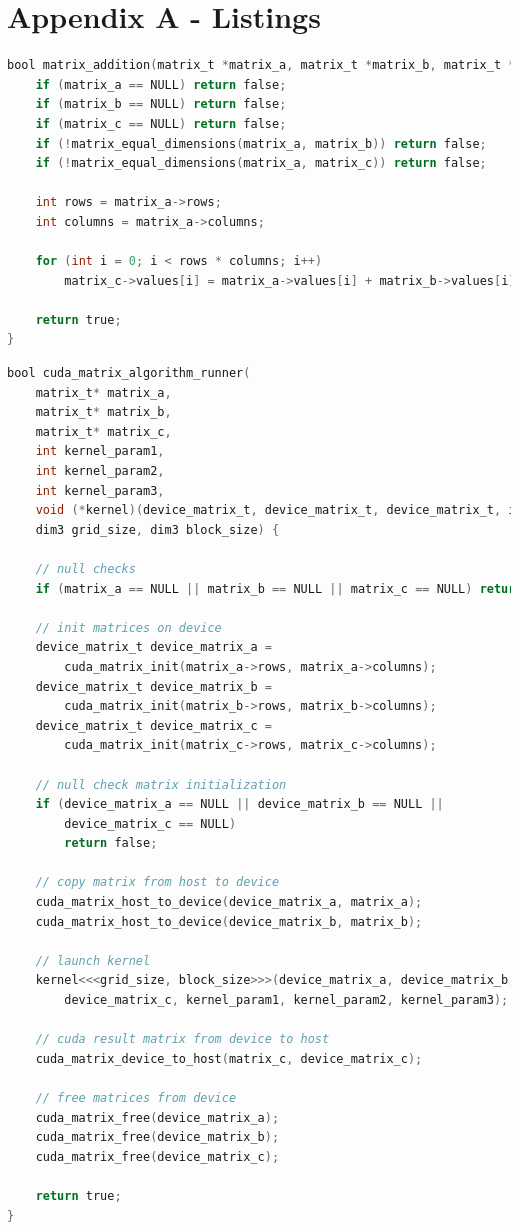 \section*{Appendix A - Listings}

\begin{lstlisting}[language=C, caption={CPU addition algorithm}, label={lst:cpu_addition}]
bool matrix_addition(matrix_t *matrix_a, matrix_t *matrix_b, matrix_t *matrix_c) {
    if (matrix_a == NULL) return false;
    if (matrix_b == NULL) return false;
    if (matrix_c == NULL) return false;
    if (!matrix_equal_dimensions(matrix_a, matrix_b)) return false;
    if (!matrix_equal_dimensions(matrix_a, matrix_c)) return false;

    int rows = matrix_a->rows;
    int columns = matrix_a->columns;

    for (int i = 0; i < rows * columns; i++)
        matrix_c->values[i] = matrix_a->values[i] + matrix_b->values[i];

    return true;
}
\end{lstlisting}

\begin{lstlisting}[language=C, caption={Algorithm runner for GPU algorithms.}, label={lst:algorithm_runner}]
bool cuda_matrix_algorithm_runner(
    matrix_t* matrix_a, 
    matrix_t* matrix_b,
    matrix_t* matrix_c, 
    int kernel_param1, 
    int kernel_param2, 
    int kernel_param3,
    void (*kernel)(device_matrix_t, device_matrix_t, device_matrix_t, int, int, int),
    dim3 grid_size, dim3 block_size) {
    
    // null checks
    if (matrix_a == NULL || matrix_b == NULL || matrix_c == NULL) return false;

    // init matrices on device
    device_matrix_t device_matrix_a =
        cuda_matrix_init(matrix_a->rows, matrix_a->columns);
    device_matrix_t device_matrix_b =
        cuda_matrix_init(matrix_b->rows, matrix_b->columns);
    device_matrix_t device_matrix_c =
        cuda_matrix_init(matrix_c->rows, matrix_c->columns);

    // null check matrix initialization
    if (device_matrix_a == NULL || device_matrix_b == NULL ||
        device_matrix_c == NULL)
        return false;

    // copy matrix from host to device
    cuda_matrix_host_to_device(device_matrix_a, matrix_a);
    cuda_matrix_host_to_device(device_matrix_b, matrix_b);

    // launch kernel
    kernel<<<grid_size, block_size>>>(device_matrix_a, device_matrix_b,
        device_matrix_c, kernel_param1, kernel_param2, kernel_param3);

    // cuda result matrix from device to host
    cuda_matrix_device_to_host(matrix_c, device_matrix_c);

    // free matrices from device
    cuda_matrix_free(device_matrix_a);
    cuda_matrix_free(device_matrix_b);
    cuda_matrix_free(device_matrix_c);

    return true;
}
\end{lstlisting}

